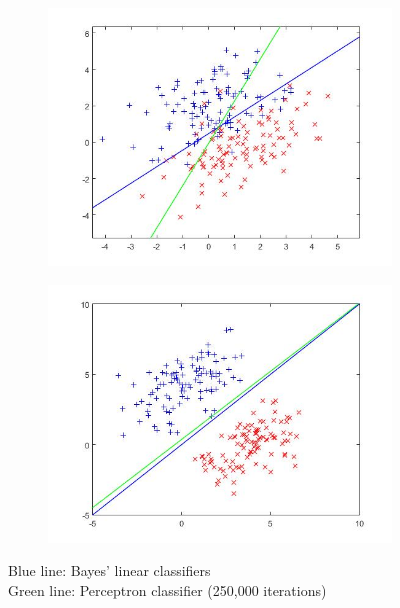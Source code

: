\documentclass[a4paper,11pt, twocolumn]{article}
\begin{document}
\begin{figure}[b]
\centering
\begin{subfigure}{.22\textwidth}
	\centering
	\includegraphics[width=\textwidth]{perceptron4.jpg}
	\label{fig:fig3a}
\end{subfigure}
\begin{subfigure}{.22\textwidth}
	\centering
	\includegraphics[width=\textwidth]{perceptron3.jpg}
	\label{fig:fig3b}
\end{subfigure}
\caption{Blue line: Bayes' linear classifiers \\ Green line: Perceptron classifier (250,000 iterations)}
\label{fig:fig3}
\end{figure}
\end{document}

